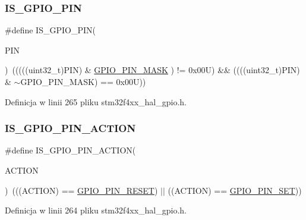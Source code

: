 \subsubsection{\texorpdfstring{I\+S\+\_\+\+G\+P\+I\+O\+\_\+\+P\+IN}{IS\_GPIO\_PIN}}
{\footnotesize\ttfamily \#define I\+S\+\_\+\+G\+P\+I\+O\+\_\+\+P\+IN(\begin{DoxyParamCaption}\item[{}]{P\+IN }\end{DoxyParamCaption})~(((((uint32\+\_\+t)P\+IN) \& \hyperlink{group___g_p_i_o__pins__define_gab135afee57cdef0f647ab153f88b6d2f}{G\+P\+I\+O\+\_\+\+P\+I\+N\+\_\+\+M\+A\+SK} ) != 0x00\+U) \&\& ((((uint32\+\_\+t)\+P\+I\+N) \& $\sim$\+G\+P\+I\+O\+\_\+\+P\+I\+N\+\_\+\+M\+A\+S\+K) == 0x00\+U))}



Definicja w linii 265 pliku stm32f4xx\+\_\+hal\+\_\+gpio.\+h.

\mbox{\label{group___g_p_i_o___private___macros_ga6da646a4924c5cfae3024c660476f26f}} 
\subsubsection{\texorpdfstring{I\+S\+\_\+\+G\+P\+I\+O\+\_\+\+P\+I\+N\+\_\+\+A\+C\+T\+I\+ON}{IS\_GPIO\_PIN\_ACTION}}
{\footnotesize\ttfamily \#define I\+S\+\_\+\+G\+P\+I\+O\+\_\+\+P\+I\+N\+\_\+\+A\+C\+T\+I\+ON(\begin{DoxyParamCaption}\item[{}]{A\+C\+T\+I\+ON }\end{DoxyParamCaption})~(((A\+C\+T\+I\+ON) == \hyperlink{group___g_p_i_o___exported___types_gga5b3ef0486b179415581eb342e0ea6b43a90af2af95004ea61d76950ff3f2f6ec2}{G\+P\+I\+O\+\_\+\+P\+I\+N\+\_\+\+R\+E\+S\+ET}) $\vert$$\vert$ ((A\+C\+T\+I\+ON) == \hyperlink{group___g_p_i_o___exported___types_gga5b3ef0486b179415581eb342e0ea6b43a746c062509db3ad1e47beed7527f9f8a}{G\+P\+I\+O\+\_\+\+P\+I\+N\+\_\+\+S\+ET}))}



Definicja w linii 264 pliku stm32f4xx\+\_\+hal\+\_\+gpio.\+h.

